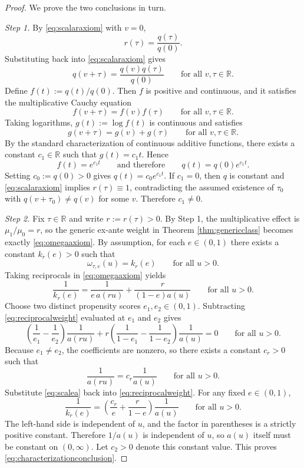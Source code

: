 \documentclass[11pt]{article}
\newcommand{\1}{\mathbf{1}}
\newcommand{\R}{\mathbb{R}}
\begin{document}
\begin{proof}
We prove the two conclusions in turn.

\medskip
\noindent
\textit{Step 1.}
By \eqref{eq:scalaraxiom} with $v=0$,
\[
r(\tau)=\frac{q(\tau)}{q(0)}.
\]
Substituting back into \eqref{eq:scalaraxiom} gives
\[
q(v+\tau)=\frac{q(v)q(\tau)}{q(0)}
\qquad \text{for all } v,\tau\in\R.
\]
Define $f(t):=q(t)/q(0)$. Then $f$ is positive and continuous, and it satisfies the multiplicative Cauchy equation
\[
f(v+\tau)=f(v)f(\tau)
\qquad \text{for all } v,\tau\in\R.
\]
Taking logarithms, $g(t):=\log f(t)$ is continuous and satisfies
\[
g(v+\tau)=g(v)+g(\tau)
\qquad \text{for all } v,\tau\in\R.
\]
By the standard characterization of continuous additive functions, there exists a constant $c_1\in\R$ such that $g(t)=c_1 t$. Hence
\[
f(t)=e^{c_1 t}
\qquad \text{and therefore} \qquad
q(t)=q(0)e^{c_1 t}.
\]
Setting $c_0:=q(0)>0$ gives $q(t)=c_0e^{c_1 t}$. If $c_1=0$, then $q$ is constant and \eqref{eq:scalaraxiom} implies $r(\tau)\equiv 1$, contradicting the assumed existence of $\tau_0$ with $q(v+\tau_0)\neq q(v)$ for some $v$. Therefore $c_1\neq 0$.

\medskip
\noindent
\textit{Step 2.}
Fix $\tau\in\R$ and write $r:=r(\tau)>0$. By Step 1, the multiplicative effect is $\mu_1/\mu_0=r$, so the generic ex-ante weight in Theorem \ref{thm:genericclass} becomes exactly \eqref{eq:omegaaxiom}. By assumption, for each $e\in(0,1)$ there exists a constant $k_r(e)>0$ such that
\[
\omega_{\tau,e}(u)=k_r(e)
\qquad \text{for all } u>0.
\]
Taking reciprocals in \eqref{eq:omegaaxiom} yields
\begin{equation}
\frac{1}{k_r(e)}
=
\frac{1}{e\,a(ru)}+\frac{r}{(1-e)a(u)}
\qquad \text{for all } u>0.
\label{eq:reciprocalweight}
\end{equation}
Choose two distinct propensity scores $e_1,e_2\in(0,1)$. Subtracting \eqref{eq:reciprocalweight} evaluated at $e_1$ and $e_2$ gives
\[
\left(\frac{1}{e_1}-\frac{1}{e_2}\right)\frac{1}{a(ru)}
+
 r\left(\frac{1}{1-e_1}-\frac{1}{1-e_2}\right)\frac{1}{a(u)}
=0
\qquad \text{for all } u>0.
\]
Because $e_1\neq e_2$, the coefficients are nonzero, so there exists a constant $c_r>0$ such that
\begin{equation}
\frac{1}{a(ru)}=c_r\frac{1}{a(u)}
\qquad \text{for all } u>0.
\label{eq:scalea}
\end{equation}
Substitute \eqref{eq:scalea} back into \eqref{eq:reciprocalweight}. For any fixed $e\in(0,1)$,
\[
\frac{1}{k_r(e)}
=
\left(\frac{c_r}{e}+\frac{r}{1-e}\right)\frac{1}{a(u)}
\qquad \text{for all } u>0.
\]
The left-hand side is independent of $u$, and the factor in parentheses is a strictly positive constant. Therefore $1/a(u)$ is independent of $u$, so $a(u)$ itself must be constant on $(0,\infty)$. Let $c_2>0$ denote this constant value. This proves \eqref{eq:characterizationconclusion}.


\end{proof}
\end{document}
